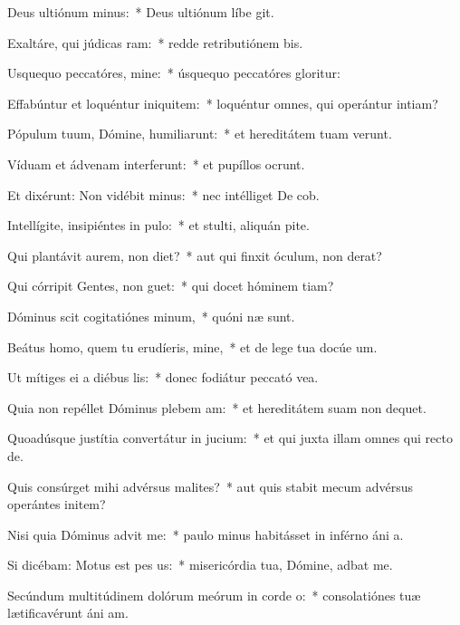 \item Deus ultiónum minus:~* Deus ultiónum líbe git.
\item Exaltáre, qui júdicas ram:~* redde retributiónem bis.
\item Usquequo peccatóres, mine:~* úsquequo peccatóres gloritur:
\item Effabúntur et loquéntur iniquitem:~* loquéntur omnes, qui operántur intiam?
\item Pópulum tuum, Dómine, humiliarunt:~* et hereditátem tuam verunt.
\item Víduam et ádvenam interferunt:~* et pupíllos ocrunt.
\item Et dixérunt: Non vidébit minus:~* nec intélliget De cob.
\item Intellígite, insipiéntes in pulo:~* et stulti, aliquán pite.
\item Qui plantávit aurem, non diet?~* aut qui finxit óculum, non derat?
\item Qui córripit Gentes, non guet:~* qui docet hóminem tiam?
\item Dóminus scit cogitatiónes minum,~* quóni næ sunt.
\item Beátus homo, quem tu erudíeris, mine,~* et de lege tua docúe um.
\item Ut mítiges ei a diébus lis:~* donec fodiátur peccató vea.
\item Quia non repéllet Dóminus plebem am:~* et hereditátem suam non dequet.
\item Quoadúsque justítia convertátur in jucium:~* et qui juxta illam omnes qui recto  de.
\item Quis consúrget mihi advérsus malites?~* aut quis stabit mecum advérsus operántes initem?
\item Nisi quia Dóminus advit me:~* paulo minus habitásset in inférno áni a.
\item Si dicébam: Motus est pes us:~* misericórdia tua, Dómine, adbat me.
\item Secúndum multitúdinem dolórum meórum in corde o:~* consolatiónes tuæ lætificavérunt áni am.
